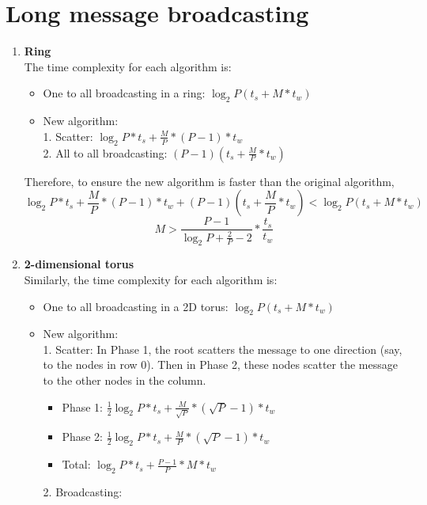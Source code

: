 \documentclass[10pt,letterpaper]{article}
\begin{document}
\section{Long message broadcasting}
\begin{enumerate}
\item \textbf{Ring}\\[10pt]
The time complexity for each algorithm is:
\begin{itemize}
\item One to all broadcasting in a ring: $\log_2P(t_s+M*t_w)$
\item New algorithm:\\[5pt] 
1. Scatter: $\log_2P*t_s+\frac{M}{P}*(P-1)*t_w$\\[5pt]
2. All to all broadcasting: $(P-1)(t_s+\frac{M}{P}*t_w)$
\end{itemize}
Therefore, to ensure the new algorithm is faster than the original algorithm,
\begin{equation*}
\log_2P*t_s+\frac{M}{P}*(P-1)*t_w + (P-1)(t_s+\frac{M}{P}*t_w) < \log_2P(t_s+M*t_w)
\end{equation*}
\begin{equation*}
M > \frac{P-1}{\log_2P+\frac{2}{P}-2}*\frac{t_s}{t_w}
\end{equation*}
\item \textbf{2-dimensional torus}\\[10pt]
Similarly, the time complexity for each algorithm is:
\begin{itemize}
\item One to all broadcasting in a 2D torus: $\log_2P(t_s+M*t_w)$
\item New algorithm:\\[5pt] 
1. Scatter: In Phase 1, the root scatters the message to one direction (say, to the nodes in row 0). Then in Phase 2, these nodes scatter the message to the other nodes in the column. \\[5pt]
\begin{itemize}
\item Phase 1: $\frac{1}{2}\log_2P*t_s+\frac{M}{\sqrt{P}}*(\sqrt{P}-1)*t_w$\\[5pt]
\item Phase 2: $\frac{1}{2}\log_2P*t_s+\frac{M}{P}*(\sqrt{P}-1)*t_w$\\[5pt]
\item Total: $\log_2P*t_s+ \frac{P-1}{P}*M*t_w$ \\[5pt]
\end{itemize}
2. Broadcasting: 
\begin{itemize}

\end{itemize}
\end{itemize}
\end{enumerate}
\end{document}
